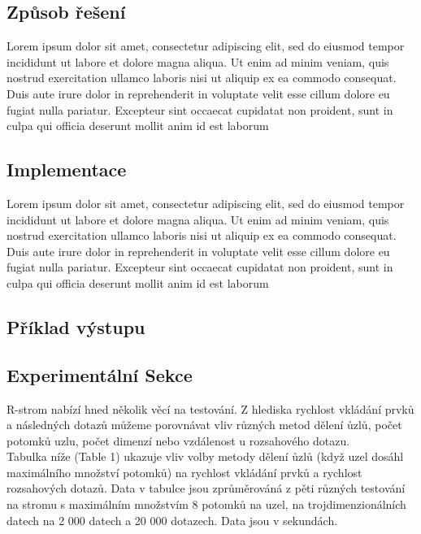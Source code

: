 \documentclass[12pt,a4paper]{article}
\begin{document}
\subsection*{Způsob řešení}
Lorem ipsum dolor sit amet, consectetur adipiscing elit, sed do eiusmod tempor incididunt ut labore et dolore magna aliqua. Ut enim ad minim veniam, quis nostrud exercitation ullamco laboris nisi ut aliquip ex ea commodo consequat. Duis aute irure dolor in reprehenderit in voluptate velit esse cillum dolore eu fugiat nulla pariatur. Excepteur sint occaecat cupidatat non proident, sunt in culpa qui officia deserunt mollit anim id est laborum\par \bigskip

\subsection*{Implementace}
Lorem ipsum dolor sit amet, consectetur adipiscing elit, sed do eiusmod tempor incididunt ut labore et dolore magna aliqua. Ut enim ad minim veniam, quis nostrud exercitation ullamco laboris nisi ut aliquip ex ea commodo consequat. Duis aute irure dolor in reprehenderit in voluptate velit esse cillum dolore eu fugiat nulla pariatur. Excepteur sint occaecat cupidatat non proident, sunt in culpa qui officia deserunt mollit anim id est laborum\par \bigskip

\subsection*{Příklad výstupu}

\subsection*{Experimentální Sekce}
R-strom nabízí hned několik věcí na testování. Z hlediska rychlost vkládání prvků a následných dotazů můžeme porovnávat vliv různých metod dělení ůzlů, počet potomků uzlu, počet dimenzí nebo vzdálenost u rozsahového dotazu.\\[0.5cm]
Tabulka níže (Table 1) ukazuje vliv volby metody dělení ůzlů (když uzel dosáhl maximálního množství potomků) na rychlost vkládání prvků a rychlost rozsahových dotazů. Data v tabulce jsou zprůměrováná z pěti různých testování na stromu s maximálním množstvím 8 potomků na uzel, na trojdimenzionálních datech na 2 000 datech a 20 000 dotazech. Data jsou v sekundách.
 
\end{document}
